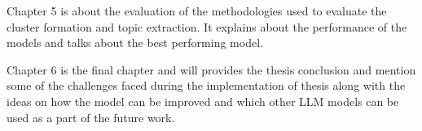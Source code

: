 Chapter 5 is about the evaluation of the methodologies used to evaluate the cluster formation and topic extraction. 
It explains about the performance of  the models and talks about the best performing model.

Chapter 6 is the final chapter and will provides the thesis conclusion and mention some of the challenges faced during
the implementation of thesis along with the ideas on how the model can be improved and which other LLM models can be used
as a part of the future work.